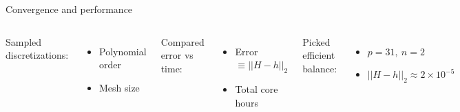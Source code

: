 \documentclass[12pt]{beamer}
\begin{document}
\begin{frame}{Convergence and performance}
\begin{columns}[c]
Sampled discretizations:
\begin{itemize}
\item Polynomial order
\item Mesh size
\end{itemize}
\vspace{10pt}

Compared error vs time:
\begin{itemize}
\item Error $ \equiv ||H-h||_2$
\item Total core hours 
\end{itemize}
\vspace{10pt}

Picked efficient balance:
\begin{itemize}
\item $p=31,~ n = 2$ 
\item $||H-h||_2 \approx 2 \times10^{-5}$ 
\end{itemize}

\includegraphics[height=0.95\textheight]{graphics/mira_H.pdf}
\end{columns}
\end{frame}
\end{document}
